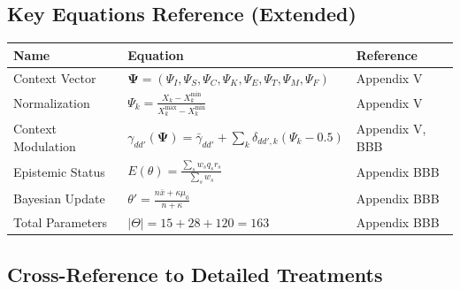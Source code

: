 \subsection{Key Equations Reference (Extended)}
\label{sec:glossary-equations-ext}

\begin{center}
\renewcommand{\arraystretch}{1.5}
\begin{tabular}{@{}lp{6cm}l@{}}
\toprule
\textbf{Name} & \textbf{Equation} & \textbf{Reference} \\
\midrule
Context Vector & $\boldsymbol{\Psi} = (\Psi_I, \Psi_S, \Psi_C, \Psi_K, \Psi_E, \Psi_T, \Psi_M, \Psi_F)$ & Appendix V \\
Normalization & $\Psi_k = \frac{X_k - X_k^{\min}}{X_k^{\max} - X_k^{\min}}$ & Appendix V \\
Context Modulation & $\gamma_{dd'}(\boldsymbol{\Psi}) = \bar{\gamma}_{dd'} + \sum_k \delta_{dd',k}(\Psi_k - 0.5)$ & Appendix V, BBB \\
Epistemic Status & $E(\theta) = \frac{\sum_s w_s q_s r_s}{\sum_s w_s}$ & Appendix BBB \\
Bayesian Update & $\theta' = \frac{n\bar{x} + \kappa\mu_0}{n + \kappa}$ & Appendix BBB \\
Total Parameters & $|\Theta| = 15 + 28 + 120 = 163$ & Appendix BBB \\
\bottomrule
\end{tabular}
\end{center}



\subsection{Cross-Reference to Detailed Treatments}

